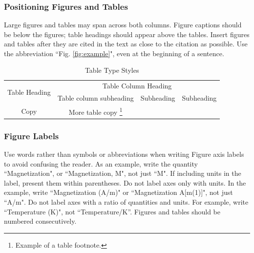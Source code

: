 \documentclass[conference]{IEEEtran}
\renewcommand\footnoterule{\vspace*{-3pt}%
     \hrule width 2in height 0.4pt
     \vspace*{2.6pt}}
\begin{document}
\subsubsection{Positioning Figures and Tables}

Large figures and tables may span across both columns. Figure captions should be below the figures; table headings should appear above the tables. Insert figures and tables after they are cited in the text as close to the citation as possible. Use the abbreviation ``Fig. \ref{fig:example}", even at the beginning of a sentence.


\begin{table}[!ht]
\renewcommand{\arraystretch}{1.2}
%
\caption{Table Type Styles}
\label{tab:example}
\noindent
\centering
    \begin{minipage}{\linewidth} %
    \renewcommand\footnoterule{\vspace*{-5pt}} %
    \begin{center}
        \begin{tabular}{c c c c}
            \toprule
            \multirow{2}{*}{Table Heading} & \multicolumn{3}{c}{Table Column Heading} \\
            \cline{2-4}
             & Table column subheading & Subheading & Subheading \\
            \midrule
            Copy & More table copy \footnote{Example of a table footnote.} & &\\
            \bottomrule
        \end{tabular}
        \end{center}
    \end{minipage}
\end{table}

\subsubsection{Figure Labels}
Use words rather than symbols or abbreviations when writing Figure axis labels to avoid confusing the reader. As an example, write the quantity ``Magnetization", or ``Magnetization, M", not just ``M". If including units in the label, present them within parentheses. Do not label axes only with units. In the example, write ``Magnetization (A/m)" or ``Magnetization {A[m(1)]}", not just ``A/m". Do not label axes with a ratio of quantities and units. For example, write ``Temperature (K)", not ``Temperature/K”.
Figures and tables should be numbered consecutively.
\end{document}
